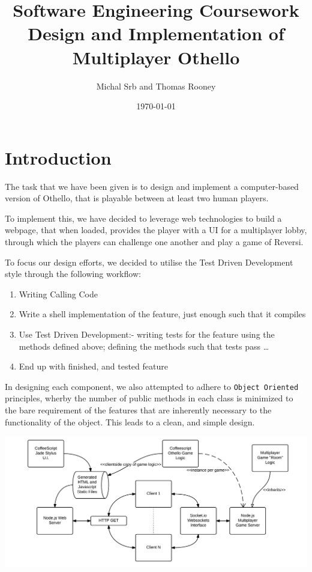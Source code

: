 \documentclass[a4wide, 11pt]{article}
\begin{document}
\title{Software Engineering Coursework \\ Design and Implementation of Multiplayer Othello}

\author{Michal Srb and Thomas Rooney}

\date{\today}         %

\maketitle            %

\section{Introduction}

The task that we have been given is to design and implement a computer-based version of Othello, that is playable between at least two human players.

To implement this, we have decided to leverage web technologies to build a webpage, that when loaded, provides the player with a UI for a multiplayer lobby, through which the players can challenge one another and play a game of Reversi.

To focus our design efforts, we decided to utilise the Test Driven Development style through the following workflow:
\begin{enumerate}
\item Writing Calling Code
\item Write a shell implementation of the feature, just enough such that it compiles
\item Use Test Driven Development:- writing tests for the feature using the methods defined above; defining the methods such that tests pass \ldots
\item End up with finished, and tested feature
\end{enumerate}

In designing each component, we also attempted to adhere to \texttt{Object Oriented} principles, wherby the number of public methods in each class is minimized to the bare requirement of the features that are inherently necessary to the functionality of the object. This leads to a clean, and simple design.

\includegraphics[width=\textwidth]{SoftwareEngineering.png}
\end{document}

